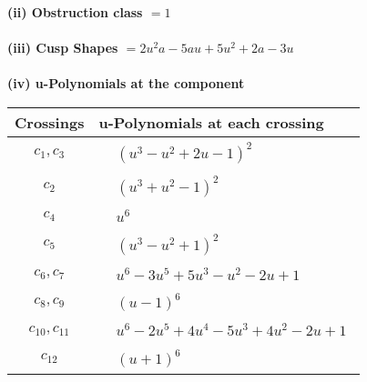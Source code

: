 \documentclass[1p]{elsarticle_modified}
\theoremstyle{definition}
\begin{document}
\flushleft \textbf{(ii) Obstruction class $= 1$}\\~\\
\flushleft \textbf{(iii) Cusp Shapes $= 2 u^2 a-5 a u+5 u^2+2 a-3 u$}\\~\\
\newpage\renewcommand{\arraystretch}{1}
\flushleft \textbf{(iv) u-Polynomials at the component}\newline \\
\begin{tabular}{m{50pt}|m{274pt}}
Crossings & \hspace{64pt}u-Polynomials at each crossing \\
\hline $$\begin{aligned}c_{1},c_{3}\end{aligned}$$&$\begin{aligned}
&(u^3- u^2+2 u-1)^2
\end{aligned}$\\
\hline $$\begin{aligned}c_{2}\end{aligned}$$&$\begin{aligned}
&(u^3+u^2-1)^2
\end{aligned}$\\
\hline $$\begin{aligned}c_{4}\end{aligned}$$&$\begin{aligned}
&u^6
\end{aligned}$\\
\hline $$\begin{aligned}c_{5}\end{aligned}$$&$\begin{aligned}
&(u^3- u^2+1)^2
\end{aligned}$\\
\hline $$\begin{aligned}c_{6},c_{7}\end{aligned}$$&$\begin{aligned}
&u^6-3 u^5+5 u^3- u^2-2 u+1
\end{aligned}$\\
\hline $$\begin{aligned}c_{8},c_{9}\end{aligned}$$&$\begin{aligned}
&(u-1)^6
\end{aligned}$\\
\hline $$\begin{aligned}c_{10},c_{11}\end{aligned}$$&$\begin{aligned}
&u^6-2 u^5+4 u^4-5 u^3+4 u^2-2 u+1
\end{aligned}$\\
\hline $$\begin{aligned}c_{12}\end{aligned}$$&$\begin{aligned}
&(u+1)^6
\end{aligned}$\\
\hline
\end{tabular}\\~\\
\end{document}
